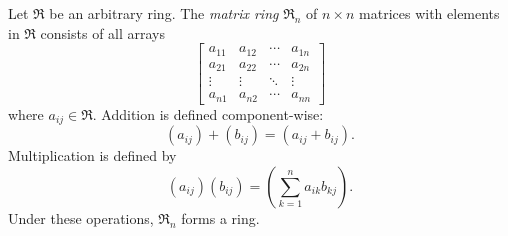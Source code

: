 Let $\mathfrak{R}$ be an arbitrary ring. The \emph{matrix ring} $\mathfrak{R}_n$ of $n \times n$ matrices with elements in $\mathfrak{R}$ consists of all arrays
$$\begin{bmatrix}
a_{11} & a_{12} & \cdots & a_{1n} \\
a_{21} & a_{22} & \cdots & a_{2n} \\
\vdots & \vdots & \ddots & \vdots \\
a_{n1} & a_{n2} & \cdots & a_{nn}
\end{bmatrix}$$
where $a_{ij} \in \mathfrak{R}$. Addition is defined component-wise:
$$(a_{ij}) + (b_{ij}) = (a_{ij} + b_{ij}).$$
Multiplication is defined by
$$(a_{ij})(b_{ij}) = \left(\sum_{k=1}^{n} a_{ik} b_{kj}\right).$$
Under these operations, $\mathfrak{R}_n$ forms a ring.
